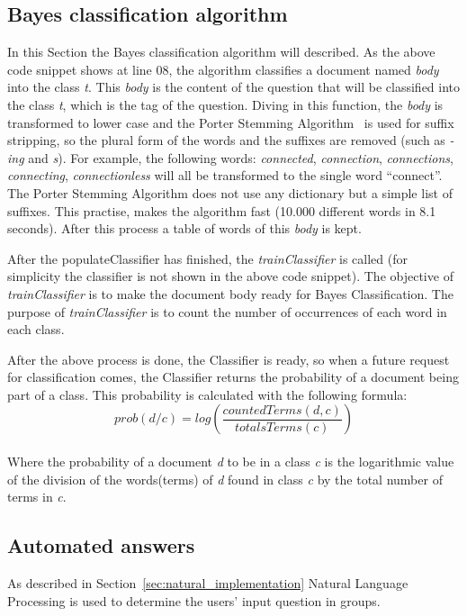 \subsection{Bayes classification algorithm}
In this Section the Bayes classification algorithm will described. As the above code snippet shows at line 08, the algorithm classifies a document named \emph{body} into the class \emph{t}. This \emph{body} is the content of the question that will be classified into the class \emph{t}, which is the tag of the question. Diving in this function, the \emph{body} is transformed to lower case and the Porter Stemming Algorithm~\citep{porter1980algorithm} is used for suffix stripping, so the plural form of the words and the suffixes are removed (such as \emph{-ing} and \emph{s}). For example, the following words: {\it connected}, {\it connection}, {\it connections}, {\it connecting}, {\it connectionless} will all be transformed to the single word ``connect''. The Porter Stemming Algorithm does not use any dictionary but a simple list of suffixes. This practise, makes the algorithm fast (10.000 different words in 8.1 seconds). After this process a table of words of this \emph{body} is kept.

After the populateClassifier has finished, the \emph{trainClassifier} is called (for simplicity the classifier is not shown in the above code snippet). The objective of \emph{trainClassifier} is to make the document body ready for Bayes Classification. The purpose of \emph{trainClassifier} is to count the number of occurrences of each word in each class.

After the above process is done, the Classifier is ready, so when a future request for classification comes, the Classifier returns the probability of a document being part of a class. This probability is calculated with the following formula:
\\
\[prob(d / c) = log\left ( \frac{countedTerms(d, c)}{totalsTerms(c)} \right )\]
\\
Where the probability of a document {\it d} to be in a class {\it c} is the logarithmic value of the division of the words(terms) of {\it d} found in class {\it c} by the total number of terms in {\it c}.

\subsection{Automated answers}
\label{sec:example_nlp}
As described in Section~\ref{sec:natural_implementation} Natural Language Processing is used to determine the users' input question in groups. 

